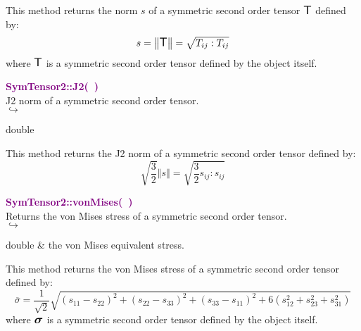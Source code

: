 This method returns the norm $s$ of a symmetric second order tensor $\mbox{\large\ensuremath{\mathsf{T}}}$ defined by:\begin{equation*}
s = \left\Vert \mbox{\large\ensuremath{\mathsf{T}}} \right\Vert  = \sqrt {T_{ij}:T_{ij}}
\end{equation*}
where $\mbox{\large\ensuremath{\mathsf{T}}}$ is a symmetric second order tensor defined by the object itself.

\textcolor{purple}{\textbf{SymTensor2::J2(~)}}\label{SymTensor2::J2()}\\
J2 norm of a symmetric second order tensor.\\ \hspace*{5mm}$\hookrightarrow$
\vspace*{-2em}\begin{tcolorbox}[grow to left by=-1cm, width=\textwidth-1cm,myArgs,tabularx={l|R}]
double
\end{tcolorbox}

This method returns the J2 norm of a symmetric second order tensor defined by:
\begin{equation*}
\sqrt {\frac{3}{2}} \left\Vert s \right\Vert  = \sqrt {\frac{3}{2} s_{ij}:s_{ij}}
\end{equation*}

\textcolor{purple}{\textbf{SymTensor2::vonMises(~)}}\label{SymTensor2::vonMises()}\\
Returns the von Mises stress of a symmetric second order tensor.\\ \hspace*{5mm}$\hookrightarrow$
\vspace*{-2em}\begin{tcolorbox}[grow to left by=-1cm, width=\textwidth-1cm,myArgs,tabularx={l|R}]
double & the von Mises equivalent stress.
\end{tcolorbox}

This method returns the von Mises stress of a symmetric second order tensor defined by:
\begin{equation*}
\overline{\sigma} = \frac {1}{\sqrt{2}}\sqrt{(s_{11}-s_{22})^2+(s_{22}-s_{33})^2+(s_{33}-s_{11})^2+6(s_{12}^2+s_{23}^2+s_{31}^2)}
\end{equation*}
where $\mbox{\large\ensuremath{\boldsymbol{\sigma}}}$ is a symmetric second order tensor defined by the object itself.

